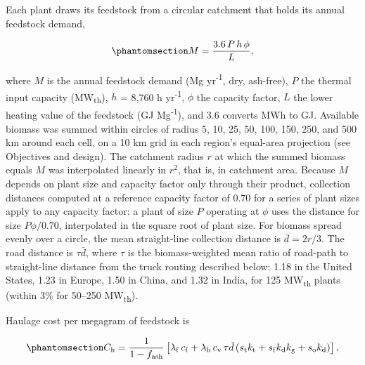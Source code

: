 \documentclass[
  letterpaper,
  twoside,
  twocolumn,
  9pt]{article}
\begin{document}
Each plant draws its feedstock from a circular catchment that holds its
annual feedstock demand,

\begin{equation}\phantomsection\label{eq-feed-demand}{M = \frac{3.6\, P\, h\, \phi}{L},}\end{equation}

where \(M\) is the annual feedstock demand (Mg yr\textsuperscript{-1},
dry, ash-free), \(P\) the thermal input capacity (MW\textsubscript{th}),
\(h\) = 8,760 h yr\textsuperscript{-1}, \(\phi\) the capacity factor,
\(L\) the lower heating value of the feedstock (GJ
Mg\textsuperscript{-1}), and 3.6 converts MWh to GJ. Available biomass
was summed within circles of radius 5, 10, 25, 50, 100, 150, 250, and
500 km around each cell, on a 10 km grid in each region's equal-area
projection (see Objectives and design). The catchment radius \(r\) at
which the summed biomass equals \(M\) was interpolated linearly in
\(r^2\), that is, in catchment area. Because \(M\) depends on plant size
and capacity factor only through their product, collection distances
computed at a reference capacity factor of 0.70 for a series of plant
sizes apply to any capacity factor: a plant of size \(P\) operating at
\(\phi\) uses the distance for size \(P\phi/0.70\), interpolated in the
square root of plant size. For biomass spread evenly over a circle, the
mean straight-line collection distance is \(\bar{d} = 2r/3\). The road
distance is \(\tau \bar{d}\), where \(\tau\) is the biomass-weighted
mean ratio of road-path to straight-line distance from the truck routing
described below: 1.18 in the United States, 1.23 in Europe, 1.50 in
China, and 1.32 in India, for 125 MW\textsubscript{th} plants (within
3\% for 50--250 MW\textsubscript{th}).

Haulage cost per megagram of feedstock is

\begin{equation}\phantomsection\label{eq-haul}{C_{\mathrm{h}} = \frac{1}{1 - f_{\mathrm{ash}}} \left[ \lambda_{\mathrm{f}}\, c_{\mathrm{f}} + \lambda_{\mathrm{h}}\, c_{\mathrm{v}}\, \tau \bar{d} \left( s_{\mathrm{t}} k_{\mathrm{t}} + s_{\mathrm{f}} k_{\mathrm{d}} k_{\mathrm{g}} + s_{\mathrm{o}} k_{\mathrm{d}} \right) \right],}\end{equation}
\end{document}

